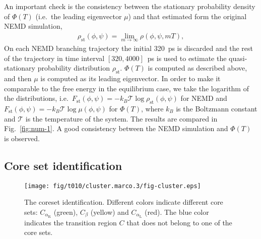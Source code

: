\documentclass[aps, pre, preprint,unsortedaddress,a4paper,onecolumn]{revtex4}
\newcommand{\myphi}{\Phi}
\newcommand{\mymu}{\mu}
\newcommand{\confaa}[0]{{\alpha_{\textrm{R}}}}
\newcommand{\confc}[0]{{\alpha_{\textrm{L}}}}
\begin{document}
An important check is the consistency between the
stationary probability density of $\Phi(T)$ (i.e.~the leading eigenvector $\mymu$) and that 
estimated form the original NEMD simulation,
\begin{align}
  \label{eq:num-tmp1}
  \rho_{\textrm{st}}(\phi,\psi) = \lim_{m\rightarrow\infty} \rho (\phi,\psi,mT),
\end{align}
On each NEMD branching trajectory the initial 320~ps is discarded and
the rest of the trajectory in time interval $[320,4000]$~ps is used to estimate
the quasi-stationary probability distribution $\rho_{\textrm{st}}$. 
$\myphi(T)$ is computed as described above, and then $\mymu$ is computed as its leading eigenvector. In order to make it comparable to the free energy in the equilibrium case, we take
the logarithm of the distributions, i.e.~$F_{\textrm{st}}(\phi,\psi)=
-k_B\mathcal T\log \rho_{\textrm{st}}(\phi,\psi)$
for NEMD and $F_{\textrm{st}}(\phi,\psi)=
-k_B\mathcal T\log \mu(\phi,\psi)$ for $\Phi(T)$, where $k_B$ is the
Boltzmann constant and $\mathcal T$ is the temperature of the system.
The
results are  compared in Fig.~\ref{fig:num-1}. A good consistency between
the  NEMD simulation and 
$\Phi(T)$ is observed.  


\subsection{Core set identification}

\begin{figure}
  \centering
  \texttt{[image: fig/t010/cluster.marco.3/fig-cluster.eps]}
  \caption{The coreset identification. Different colors indicate different core sets: $C_{\confaa}$ (green), $C_\beta$ (yellow) and $C_{\confc}$ (red).
    The blue color indicates the transition region $C$ that does not belong to one of the core sets.}
  \label{fig:cluster}
\end{figure}
\end{document}
